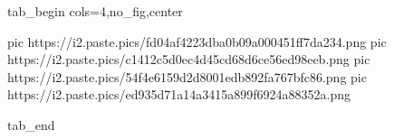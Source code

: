  
 
 
 
 


\ifcmt
  tab_begin cols=4,no_fig,center

     pic https://i2.paste.pics/fd04af4223dba0b09a000451ff7da234.png
		 pic https://i2.paste.pics/c1412c5d0ec4d45cd68d6ce56ed98eeb.png
		 pic https://i2.paste.pics/54f4e6159d2d8001edb892fa767bfc86.png
		 pic https://i2.paste.pics/ed935d71a14a3415a899f6924a88352a.png

  tab_end
\fi
